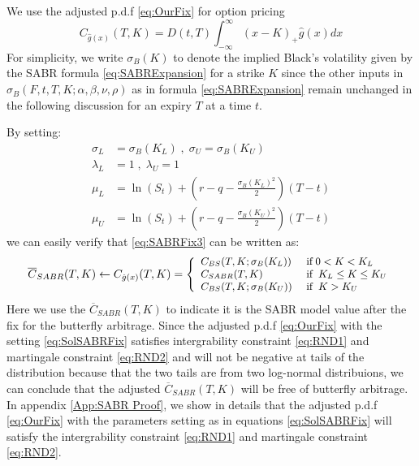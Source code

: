 \documentclass[letterpaper,12pt,titlepage,oneside,final]{book}
\numberwithin{equation}{section}
\theoremstyle{definition}
\begin{document}
We use the adjusted p.d.f \eqref{eq:OurFix} for option pricing
\begin{equation}
	C_{\hat{g}(x)}(T,K)=D(t,T)\int_{-\infty}^{\infty} (x-K)_+ \hat{g}(x) dx
	\label{eq:SABRFix3}
\end{equation}
For simplicity, we write $\sigma_{B}(K)$ to denote the implied Black's volatility given by the SABR formula \eqref{eq:SABRExpansion} for a strike $K$ since the other inputs in  $\sigma_{B}(F,t,T,K;\alpha,\beta,\nu,\rho)$  as in formula \eqref{eq:SABRExpansion} remain unchanged in the following discussion for an expiry $T$ at a time $t$.


By setting: 
\begin{equation}
\begin{split}
	\sigma_{L}&=\sigma_{B}(K_L)\;,\;\sigma_{U}=\sigma_{B}(K_U)\\
	\lambda_{L}&=1 \;,\;\lambda_{U}=1\\
	\mu_L&=\ln(S_t)+(r-q-\frac{\sigma_{B}(K_L)^2}{2})(T-t)\\ 
	\mu_U&=\ln(S_t)+(r-q-\frac{\sigma_{B}(K_U)^2}{2})(T-t)
\end{split}
\label{eq:SolSABRFix}
\end{equation}
we can easily verify that \eqref{eq:SABRFix3} can be written as:
\[\small
	\overline{C}_{SABR}(T,K) \leftarrow C_{\hat{g}(x)}(T,K)=\left\{ \begin{array}{ll }
		 C_{BS}(T,K;\sigma_{B}(K_L))\;&  \text{if} \; 0<K< K_{L}\\

		C_{SABR}(T,K)\;&  \text{if} \; \;  K_{L} \leq K \leq K_{U}\\

		C_{BS}(T,K;\sigma_{B}(K_U)) \; &  \text{if} \; \;  K> K_{U}
\end{array} \right.
 \]
Here we use the $\overline{C}_{SABR}(T,K)$ to indicate it is the SABR model value after the  fix for the butterfly arbitrage.  Since the adjusted p.d.f \eqref{eq:OurFix} with the setting \eqref{eq:SolSABRFix} satisfies intergrability constraint \eqref{eq:RND1} and martingale  constraint \eqref{eq:RND2} and will not be negative at tails of the distribution because that the two tails are from two log-normal distribuions, we can conclude that the adjusted $\overline{C}_{SABR}(T,K)$ will be free of butterfly arbitrage. In appendix \ref{App:SABR Proof}, we show in details that the adjusted p.d.f \eqref{eq:OurFix} with the parameters  setting as in equations \eqref{eq:SolSABRFix} will satisfy the intergrability constraint \eqref{eq:RND1} and martingale  constraint \eqref{eq:RND2}.
\end{document}
